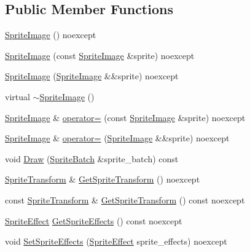 \subsection*{Public Member Functions}
\begin{DoxyCompactItemize}
\item 
\hyperlink{classmage_1_1_sprite_image_aee1a41099068c4037f29e98b7c5d84ae}{Sprite\+Image} () noexcept
\item 
\hyperlink{classmage_1_1_sprite_image_a707cc96ae9b15fd85ce0c70d1eed458d}{Sprite\+Image} (const \hyperlink{classmage_1_1_sprite_image}{Sprite\+Image} \&sprite) noexcept
\item 
\hyperlink{classmage_1_1_sprite_image_aedd0892075000cb3217550d1a924f926}{Sprite\+Image} (\hyperlink{classmage_1_1_sprite_image}{Sprite\+Image} \&\&sprite) noexcept
\item 
virtual \hyperlink{classmage_1_1_sprite_image_a9121ee110f7e64ee6e936e0d3350ab44}{$\sim$\+Sprite\+Image} ()
\item 
\hyperlink{classmage_1_1_sprite_image}{Sprite\+Image} \& \hyperlink{classmage_1_1_sprite_image_a7596ba158f703bb255e9ba3f20fb04bd}{operator=} (const \hyperlink{classmage_1_1_sprite_image}{Sprite\+Image} \&sprite) noexcept
\item 
\hyperlink{classmage_1_1_sprite_image}{Sprite\+Image} \& \hyperlink{classmage_1_1_sprite_image_a0938a287bb8c78373d60a89ecc880561}{operator=} (\hyperlink{classmage_1_1_sprite_image}{Sprite\+Image} \&\&sprite) noexcept
\item 
void \hyperlink{classmage_1_1_sprite_image_ae30d3293931f674fea17008063755bb6}{Draw} (\hyperlink{classmage_1_1_sprite_batch}{Sprite\+Batch} \&sprite\+\_\+batch) const
\item 
\hyperlink{classmage_1_1_sprite_transform}{Sprite\+Transform} \& \hyperlink{classmage_1_1_sprite_image_a6293955aa7912f8bf846407ee5d0cfa2}{Get\+Sprite\+Transform} () noexcept
\item 
const \hyperlink{classmage_1_1_sprite_transform}{Sprite\+Transform} \& \hyperlink{classmage_1_1_sprite_image_a109a0bd7938b91944b42a2969bb9bdf7}{Get\+Sprite\+Transform} () const noexcept
\item 
\hyperlink{namespacemage_ad62ebdf0e7aae0caf1535a4ea3f056ea}{Sprite\+Effect} \hyperlink{classmage_1_1_sprite_image_a6cfc44918ef3076983e6e1f03de612c8}{Get\+Sprite\+Effects} () const noexcept
\item 
void \hyperlink{classmage_1_1_sprite_image_a81f8297413245635b505374068abe588}{Set\+Sprite\+Effects} (\hyperlink{namespacemage_ad62ebdf0e7aae0caf1535a4ea3f056ea}{Sprite\+Effect} sprite\+\_\+effects) noexcept

\end{DoxyCompactItemize}
